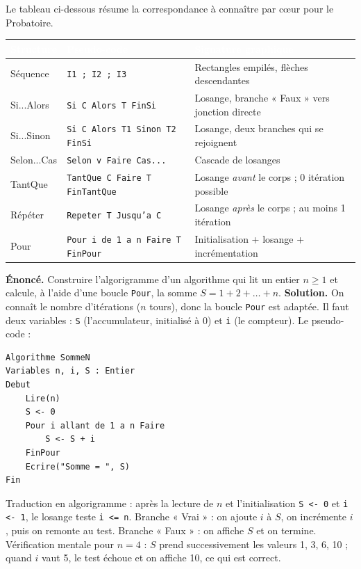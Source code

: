 \documentclass[11pt]{article}
\begin{document}
Le tableau ci-dessous résume la correspondance à connaître par cœur pour le Probatoire.

\begin{center}
\begin{tabularx}{\linewidth}{|l|X|X|}
\hline
\rowcolor{popblue}\textcolor{white}{\textbf{Structure}} & \textcolor{white}{\textbf{Pseudo-code}} & \textcolor{white}{\textbf{Signature graphique}} \\
\hline
Séquence & \texttt{I1 ; I2 ; I3} & Rectangles empilés, flèches descendantes \\
\hline
Si...Alors & \texttt{Si C Alors T FinSi} & Losange, branche « Faux » vers jonction directe \\
\hline
Si...Sinon & \texttt{Si C Alors T1 Sinon T2 FinSi} & Losange, deux branches qui se rejoignent \\
\hline
Selon...Cas & \texttt{Selon v Faire Cas...} & Cascade de losanges \\
\hline
TantQue & \texttt{TantQue C Faire T FinTantQue} & Losange \emph{avant} le corps ; 0 itération possible \\
\hline
Répéter & \texttt{Repeter T Jusqu'a C} & Losange \emph{après} le corps ; au moins 1 itération \\
\hline
Pour & \texttt{Pour i de 1 a n Faire T FinPour} & Initialisation + losange + incrémentation \\
\hline
\end{tabularx}
\end{center}

\begin{exoresolu}
\textbf{Énoncé.} Construire l'algorigramme d'un algorithme qui lit un entier $n \ge 1$ et calcule, à l'aide d'une boucle \texttt{Pour}, la somme $S = 1 + 2 + \dots + n$.
\tcblower
\textbf{Solution.} On connaît le nombre d'itérations ($n$ tours), donc la boucle \texttt{Pour} est adaptée. Il faut deux variables : \texttt{S} (l'accumulateur, initialisé à 0) et \texttt{i} (le compteur). Le pseudo-code :
\begin{lstlisting}
Algorithme SommeN
Variables n, i, S : Entier
Debut
    Lire(n)
    S <- 0
    Pour i allant de 1 a n Faire
        S <- S + i
    FinPour
    Ecrire("Somme = ", S)
Fin
\end{lstlisting}
Traduction en algorigramme : après la lecture de $n$ et l'initialisation \texttt{S <- 0} et \texttt{i <- 1}, le losange teste \texttt{i <= n}. Branche « Vrai » : on ajoute $i$ à $S$, on incrémente $i$, puis on remonte au test. Branche « Faux » : on affiche $S$ et on termine. Vérification mentale pour $n = 4$ : $S$ prend successivement les valeurs 1, 3, 6, 10 ; quand $i$ vaut 5, le test échoue et on affiche 10, ce qui est correct.
\end{exoresolu}
\end{document}

